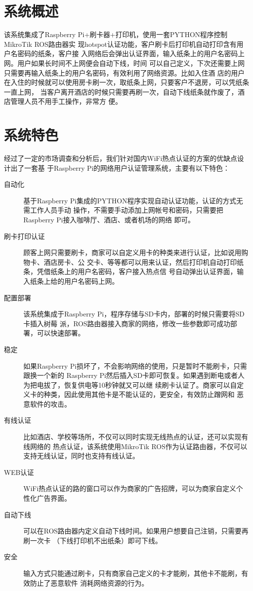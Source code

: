 \section{系统概述}

该系统集成了Raspberry Pi+刷卡器+打印机，使用一套PYTHON程序控制MikroTik ROS路由器实
现hotspot\cite{wifi-hotspot}认证功能，客户刷卡后打印机自动打印含有用户名密码的纸条，客户接
入网络后会弹出认证界面，输入纸条上的用户名密码上网。用户如果长时间不上网便会自动下线，时间
可以自己定义，下次还需要上网只需要再输入纸条上的用户名密码，有效利用了网络资源。比如入住酒
店的用户在入住的时候就可以使用房卡刷一次，取纸条上网，只要客户不退房，可以凭纸条一直上网，
当客户离开酒店的时候只需要再刷一次，自动下线纸条就作废了，酒店管理人员不用手工操作，非常方
便。

\section{系统特色}

经过了一定的市场调查和分析后，我们针对国内WiFi热点认证的方案的优缺点设计出了一套基
于Raspberry Pi的网络用户认证管理系统，主要有以下特色：

\begin{description}
\item[自动化] 基于Raspberry Pi集成的PYTHON程序实现自动认证功能，认证的方式无需工作人员手动
  操作，不需要手动添加上网帐号和密码，只需要把Raspberry Pi接入咖啡厅、酒店、或者机场的网络
  即可。
\item[刷卡打印认证] 顾客上网只需要刷卡，商家可以自定义用卡的种类来进行认证，比如说用购物卡、酒店房卡、公
  交卡、等等都可以用来认证，然后打印机自动打印纸条，凭借纸条上的用户名密码，客户接入热点信
  号自动弹出认证界面，输入纸条上给的用户名密码上网。
\item[配置部署] 该系统集成于Raspberry Pi，程序存储与SD卡内，部署的时候只需要将SD卡插入树莓
  派，ROS路由器接入商家的网络，修改一些参数即可成功部署，可以快速部署。
\item[稳定] 如果Raspberry Pi损坏了，不会影响网络的使用，只是暂时不能刷卡，只需跟换一个新的
  Raspberry Pi然后插入SD卡即可恢复。如果遇到断电或者人为把电拔了，恢复供电等10秒钟就又可以继
  续刷卡认证了。商家可以自定义卡的种类，因此使用其他卡是不能认证的，更安全，有效防止蹭网和
  恶意软件的攻击。
\item[有线认证] 比如酒店、学校等场所，不仅可以同时实现无线热点的认证，还可以实现有线网络的
  热点认证，该系统使用MikroTik ROS\cite{ros}作为认证路由器，不仅可以支持无线认证，同时也支持有线认证。
\item[WEB认证] WiFi热点认证的路的窗口可以作为商家的广告招牌，可以为商家自定义个性化广告界面。
\item[自动下线] 可以在ROS路由器内定义自动下线时间。如果用户想要自己注销，只需要再刷一次卡
  （下线打印机不出纸条）即可下线。
\item[安全] 输入方式只能通过刷卡，只有商家自己定义的卡才能刷，其他卡不能刷，有效防止了恶意软件
  消耗网络资源的行为。
\end{description}


